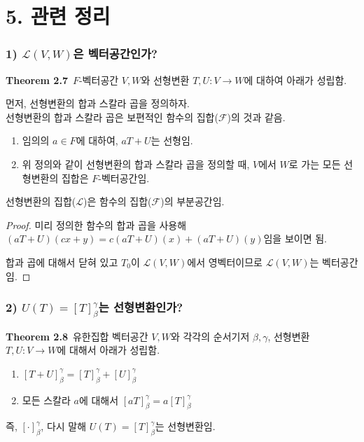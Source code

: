 \documentclass[10pt, a4paper]{article}
\begin{document}
\section*{5. 관련 정리}

\subsubsection*{1) $\mathcal{L}(V,W)$은 벡터공간인가?}
\textbf{Theorem 2.7}\, $F$-벡터공간 $V,W$와 선형변환 $T,U:V \rightarrow W$에 대하여 아래가 성립함.

먼저, 선형변환의 합과 스칼라 곱을 정의하자.\\
선형변환의 합과 스칼라 곱은 보편적인 함수의 집합($\mathcal{F}$)의 것과 같음.

\begin{enumerate}
    \item 임의의 $a \in F$에 대하여, $aT+U$는 선형임.
    \item 위 정의와 같이 선형변환의 합과 스칼라 곱을 정의할 때, $V$에서 $W$로 가는 모든 선형변환의 집합은 $F$-벡터공간임.
\end{enumerate}

선형변환의 집합($\mathcal{L}$)은 함수의 집합($\mathcal{F}$)의 부분공간임.

\begin{proof}
미리 정의한 함수의 합과 곱을 사용해 $(aT+U)(cx+y)=c(aT+U)(x)+(aT+U)(y)$임을 보이면 됨.

합과 곱에 대해서 닫혀 있고 $T_0$이 $\mathcal{L}(V,W)$에서 영벡터이므로 $\mathcal{L}(V,W)$는 벡터공간임.
\end{proof}


\subsubsection*{2) $U(T)=[T]_{\beta}^{\gamma}$는 선형변환인가?}
\textbf{Theorem 2.8}\, 유한집합 벡터공간 $V,W$와 각각의 순서기저 $\beta,\gamma$, 선형변환 $T,U:V \rightarrow W$에 대해서 아래가 성립함.

\begin{enumerate}
    \item $[T+U]_{\beta}^{\gamma}=[T]_{\beta}^{\gamma}+[U]_{\beta}^{\gamma}$
    \item 모든 스칼라 $a$에 대해서 $[aT]_{\beta}^{\gamma}=a[T]_{\beta}^{\gamma}$
\end{enumerate}

즉, $[\cdot]_{\beta}^{\gamma}$, 다시 말해 $U(T)=[T]_{\beta}^{\gamma}$는 선형변환임.
\end{document}
